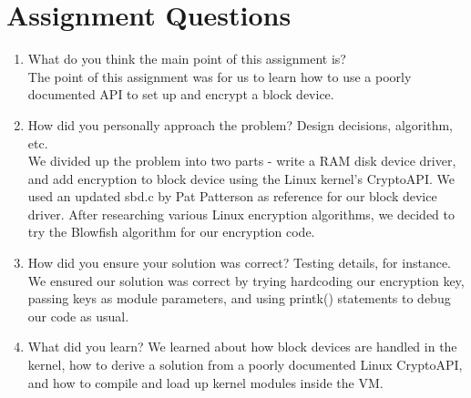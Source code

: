 \documentclass[letterpaper,10pt]{article}
\begin{document}
\section*{Assignment Questions}

\begin{enumerate}
  \item{What do you think the main point of this assignment is?}\\
	The point of this assignment was for us to learn how to use a poorly documented API to set up and encrypt a block device.
  
  \item{How did you personally approach the problem? Design decisions, algorithm, etc.}\\
	We divided up the problem into two parts - write a RAM disk device driver, and add encryption to block device using the Linux kernel's CryptoAPI.
	We used an updated sbd.c by Pat Patterson as reference for our block device driver. After researching various Linux encryption algorithms, we decided to try the Blowfish algorithm for our encryption code.
  
  \item{How did you ensure your solution was correct? Testing details, for instance.}
	We ensured our solution was correct by trying hardcoding our encryption key, passing keys as module parameters, and using printk() statements to debug our code as usual.
  
  \item{What did you learn?}
  	We learned about how block devices are handled in the kernel, how to derive a solution from a poorly documented Linux CryptoAPI, and how to compile and load up kernel modules inside the VM.
  
\end{enumerate}
\end{document}
